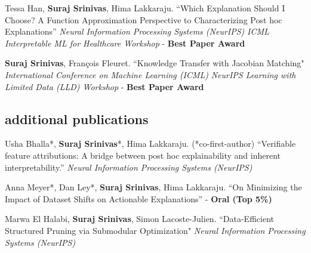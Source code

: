 \documentclass[11pt, a4paper, english]{moderncv}        %
\newcommand{\cvsection}[1]{\vspace{0.3cm}\subsection{\Large{{#1}}}}
\begin{document}
 {Tessa Han, \textbf{Suraj Srinivas}, Hima Lakkaraju. 
\newline ``Which Explanation Should I Choose? A Function Approximation Perspective to Characterizing Post hoc Explanations''
\newline \textit{Neural Information Processing Systems (NeurIPS)} \newline \textit{ICML Interpretable ML for Healthcare Workshop} - \textbf{Best Paper Award}}
\vspace*{0.25em}

\vspace*{0.25em}

 {\textbf{Suraj Srinivas}, Fran\c{c}ois Fleuret.
\newline ``Knowledge Transfer with Jacobian Matching" 
\newline \textit{International Conference on Machine Learning (ICML)}
\newline \textit{NeurIPS Learning with Limited Data (LLD) Workshop} - \textbf{Best Paper Award}
}
\vspace*{0.25em}

\cvsection{additional publications}
\vspace{0.1cm}
 {Usha Bhalla*, \textbf{Suraj Srinivas}*, Hima Lakkaraju. (*co-first-author) \newline ``Verifiable feature attributions: A bridge between post hoc explainability and inherent interpretability.'' 
\newline \textit{Neural Information Processing Systems (NeurIPS)}}
\vspace*{0.25em}

 {Anna Meyer*, Dan Ley*, \textbf{Suraj Srinivas}, Hima Lakkaraju. \newline ``On Minimizing the Impact of Dataset Shifts on Actionable Explanations''  - \textbf{Oral (Top 5\%)}
}
\vspace*{0.25em}

 {Marwa El Halabi, \textbf{Suraj Srinivas}, Simon Lacoste-Julien.
\newline ``Data-Efficient Structured Pruning via Submodular Optimization" \newline \textit{Neural Information Processing Systems (NeurIPS)}}
\end{document}
